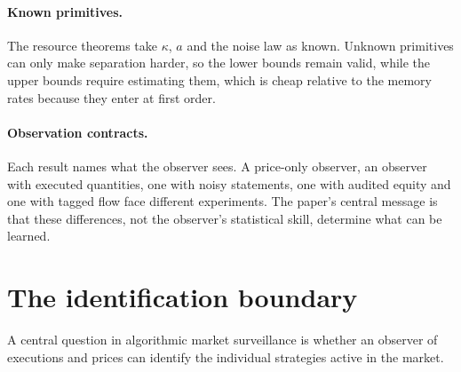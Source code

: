 \paragraph{Known primitives.} The resource theorems take $\kappa$, $a$ and the noise law as known. Unknown primitives can only make separation harder, so the lower bounds remain valid, while the upper bounds require estimating them, which is cheap relative to the memory rates because they enter at first order.

\paragraph{Observation contracts.} Each result names what the observer sees. A price-only observer, an observer with executed quantities, one with noisy statements, one with audited equity and one with tagged flow face different experiments. The paper's central message is that these differences, not the observer's statistical skill, determine what can be learned.
\section{The identification boundary}\label{p1:sec:ident}

A central question in algorithmic market surveillance is whether an observer of executions and prices can identify the individual strategies active in the market.

